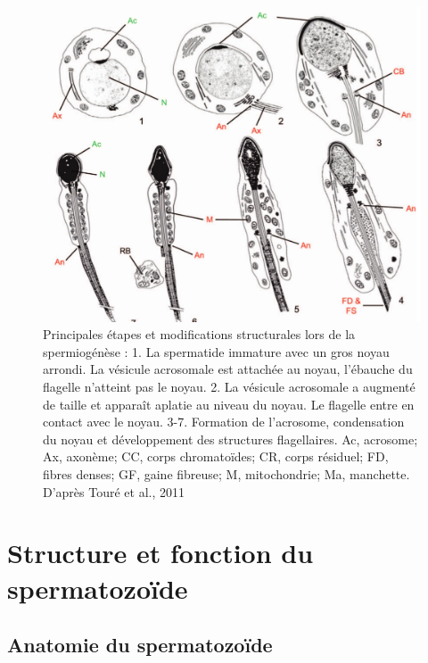 \documentclass[12pt,twoside]{reedthesis}
\theoremstyle{definition}
\theoremstyle{definition}
\theoremstyle{remark}
\begin{document}
  \begin{figure}
  
  {\centering \includegraphics[scale=0.3]{figure/spermiogenese} 
  
  }
  
  \caption[Principales étapes et modifications structurales lors de la spermiogénèse]{Principales étapes et modifications structurales lors de la spermiogénèse : 1. La spermatide immature avec un gros noyau arrondi. La vésicule acrosomale est attachée au noyau, l’ébauche du flagelle n’atteint pas le noyau. 2. La vésicule acrosomale a augmenté de taille et apparaît aplatie au niveau du noyau. Le flagelle entre en contact avec le noyau. 3-7. Formation de l’acrosome, condensation du noyau et développement des structures flagellaires. Ac, acrosome; Ax, axonème; CC, corps chromatoïdes; CR, corps résiduel; FD, fibres denses; GF, gaine fibreuse; M, mitochondrie; Ma, manchette. D’après Touré et al., 2011}\label{fig:spermiogenese}
  \end{figure}
  
  \section{Structure et fonction du
  spermatozoïde}\label{structure-et-fonction-du-spermatozoide}
  
  \subsection{Anatomie du spermatozoïde}\label{anatomie-du-spermatozoide}
  
\end{document}
